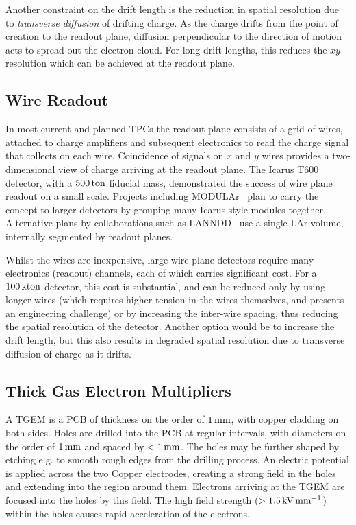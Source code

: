 Another constraint on the drift length is the reduction in spatial resolution due to \emph{transverse diffusion} of drifting charge. As the charge drifts from the point of creation to the readout plane, diffusion perpendicular to the direction of motion acts to spread out the electron cloud. For long drift lengths, this reduces the $xy$ resolution which can be achieved at the readout plane.

\subsection{Wire Readout}
In most current and planned \acsp{TPC} the readout plane consists of a grid of wires, attached to charge amplifiers and subsequent electronics to read the charge signal that collects on each wire. Coincidence of signals on $x$ and $y$ wires provides a two-dimensional view of charge arriving at the readout plane. The Icarus T600~\citep{Amerio2004} detector, with a $500\,\mathrm{ton}$ fiducial mass, demonstrated the success of wire plane readout on a small scale. Projects including MODULAr~\citep{Baibussinov2008} plan to carry the concept to larger detectors by grouping many Icarus-style modules together. Alternative plans by collaborations such as LANNDD~\citep{Cline2003} use a single \ac{LAr} volume, internally segmented by readout planes.

Whilst the wires are inexpensive, large wire plane detectors require many electronics (readout) channels, each of which carries significant cost. For a $100\,\mathrm{kton}$ detector, this cost is substantial, and can be reduced only by using longer wires (which requires higher tension in the wires themselves, and presents an engineering challenge) or by increasing the inter-wire spacing, thus reducing the spatial resolution of the detector. Another option would be to increase the drift length, but this also results in degraded spatial resolution due to transverse diffusion of charge as it drifts.

\subsection{Thick Gas Electron Multipliers}
A \ac{TGEM} is a \ac{PCB} of thickness on the order of $1\,\mathrm{mm}$, with copper cladding on both sides. Holes are drilled into the \ac{PCB} at regular intervals, with diameters on the order of $1\,\mathrm{mm}$ and spaced by $< 1\,\mathrm{mm}$. The holes may be further shaped by etching e.g. to smooth rough edges from the drilling process. An electric potential is applied across the two Copper electrodes, creating a strong field in the holes and extending into the region around them. Electrons arriving at the \ac{TGEM} are focused into the holes by this field. The high field strength ($> 1.5 \,\mathrm{kV} \,\mathrm{mm}^{-1}$) within the holes causes rapid acceleration of the electrons.


